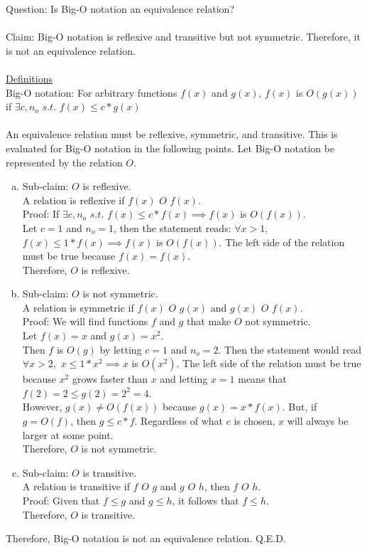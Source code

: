 \documentclass{article}
\begin{document}
\clearpage
\header

Question: Is Big-O notation an equivalence relation? \\\\
Claim: Big-O notation is reflexive and transitive but not symmetric. Therefore, it is not an equivalence relation. \\\\
\underline{Definitions} \\
Big-O notation: For arbitrary functions $f(x)$ and $g(x)$, $f(x)$ is $O(g(x))$ if $\exists c,n_o$ $s.t.$ $f(x) \leq c*g(x)$ \\\\
	An equivalence relation must be reflexive, symmetric, and transitive. This is evaluated for Big-O notation in the following points. Let Big-O notation be represented by the relation $O$.
	\begin{enumerate}[(a)]
		\item Sub-claim: $O$ is reflexive. \\
			A relation is reflexive if $f(x)$ $O$ $f(x)$. \\
			Proof: If $\exists c,n_o$ $s.t.$ $f(x) \leq c*f(x) \implies f(x)$ is $O(f(x))$. \\
			Let $c=1$ and $n_o=1$, then the statement reads: $\forall x>1,$ $f(x) \leq 1*f(x) \implies f(x)$ is $O(f(x))$. The left side of the relation must be true because $f(x)=f(x)$. \\
			Therefore, $O$ is reflexive.
		\item Sub-claim: $O$ is not symmetric. \\
			A relation is symmetric if $f(x)$ $O$ $g(x)$ and $g(x)$ $O$ $f(x)$. \\
			Proof: We will find functions $f$ and $g$ that make $O$ not symmetric. \\
			Let $f(x)=x$ and $g(x)=x^2$. \\
			Then $f$ is $O(g)$ by letting $c=1$ and $n_o=2$. Then the statement would read $\forall x>2,$ $x \leq 1*x^2 \implies x$ is $O(x^2)$. The left side of the relation must be true because $x^2$ grows faster than $x$ and letting $x=1$ means that $f(2)=2 \leq g(2)=2^2=4$. \\
			However, $g(x) \neq O(f(x))$ because $g(x)=x*f(x)$. But, if $g=O(f)$, then $g \leq c*f$. Regardless of what $c$ is chosen, $x$ will always be larger at some point. \\
			Therefore, $O$ is not symmetric.
		\item Sub-claim: $O$ is transitive. \\
			A relation is transitive if $f$ $O$ $g$ and $g$ $O$ $h$, then $f$ $O$ $h$. \\
			Proof: Given that $f \leq g$ and $g \leq h$, it follows that $f \leq h$. \\
			Therefore, $O$ is transitive.
	\end{enumerate}
	Therefore, Big-O notation is not an equivalence relation. Q.E.D.
\end{document}
